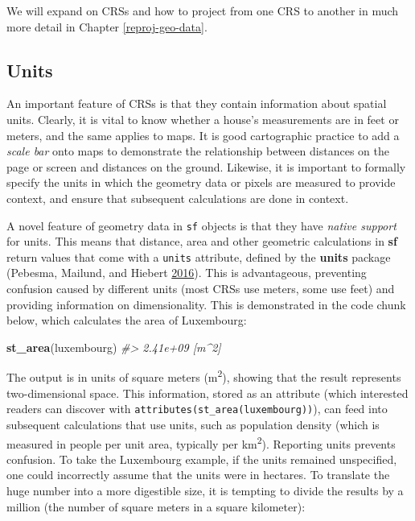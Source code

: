 \documentclass[]{krantz}
\newenvironment{Shaded}{\begin{snugshade}}{\end{snugshade}}
\newcommand{\CommentTok}[1]{\textcolor[rgb]{0.37,0.37,0.37}{\textit{#1}}}
\newcommand{\KeywordTok}[1]{\textcolor[rgb]{0.27,0.27,0.27}{\textbf{#1}}}
\newcommand{\NormalTok}[1]{#1}
\newcommand{\OperatorTok}[1]{\textcolor[rgb]{0.43,0.43,0.43}{\textbf{#1}}}
\newcommand{\StringTok}[1]{\textcolor[rgb]{0.5,0.5,0.5}{#1}}
\begin{document}
We will expand on CRSs and how to project from one CRS to another in much more detail in Chapter \ref{reproj-geo-data}.

\hypertarget{units}{%
\subsection{Units}\label{units}}

An important feature of CRSs is that they contain information about spatial units.
Clearly, it is vital to know whether a house's measurements are in feet or meters, and the same applies to maps.
It is good cartographic practice to add a \emph{scale bar} onto maps to demonstrate the relationship between distances on the page or screen and distances on the ground.
Likewise, it is important to formally specify the units in which the geometry data or pixels are measured to provide context, and ensure that subsequent calculations are done in context.

A novel feature of geometry data in \texttt{sf} objects is that they have \emph{native support} for units.
This means that distance, area and other geometric calculations in \textbf{sf} return values that come with a \texttt{units} attribute, defined by the \textbf{units} package (Pebesma, Mailund, and Hiebert \protect\hyperlink{ref-pebesma_measurement_2016}{2016}).
This is advantageous, preventing confusion caused by different units (most CRSs use meters, some use feet) and providing information on dimensionality.
This is demonstrated in the code chunk below, which calculates the area of Luxembourg:

\begin{Shaded}
\end{Shaded}

\begin{Shaded}
\begin{Highlighting}[]
\KeywordTok{st_area}\NormalTok{(luxembourg)}
\CommentTok{#> 2.41e+09 [m^2]}
\end{Highlighting}
\end{Shaded}

The output is in units of square meters (m\textsuperscript{2}), showing that the result represents two-dimensional space.
This information, stored as an attribute (which interested readers can discover with \texttt{attributes(st\_area(luxembourg))}), can feed into subsequent calculations that use units, such as population density (which is measured in people per unit area, typically per km\textsuperscript{2}).
Reporting units prevents confusion.
To take the Luxembourg example, if the units remained unspecified, one could incorrectly assume that the units were in hectares.
To translate the huge number into a more digestible size, it is tempting to divide the results by a million (the number of square meters in a square kilometer):
\end{document}
